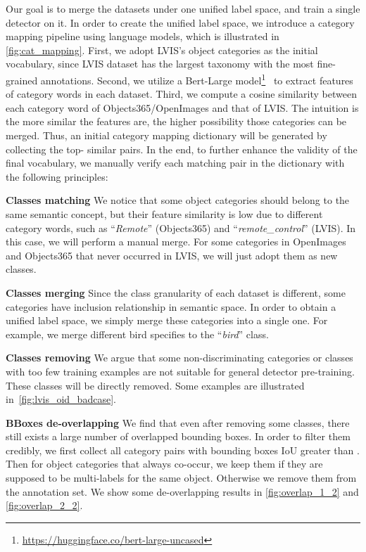 \documentclass[10pt,twocolumn,letterpaper]{article}
\begin{document}
Our goal is to merge the datasets under one unified label space, and train a single detector on it. In order to create the unified label space, we introduce a category mapping pipeline using language models, which is illustrated in \cref{fig:cat_mapping}.
First, we adopt LVIS's object categories as the initial vocabulary, since LVIS dataset has the largest taxonomy with the most fine-grained annotations.
Second, we utilize a Bert-Large model\footnote{\url{https://huggingface.co/bert-large-uncased}}~\cite{devlin2018bert} to extract features of category words in each dataset.
Third, we compute a cosine similarity between each category word of Objects365/OpenImages and that of LVIS. 
The intuition is the more similar the features are, the higher possibility those categories can be merged. 
Thus, an initial category mapping dictionary will be generated by collecting the top- similar pairs. 
In the end, to further enhance the validity of the final vocabulary, we manually verify each matching pair in the dictionary with the following principles:

\noindent \textbf{Classes matching} 
We notice that some object categories should belong to the same semantic concept, but their feature similarity is low due to different category words, such as ``\textit{Remote}'' (Objects365) and ``\textit{remote\_control}'' (LVIS). 
In this case, we will perform a manual merge.
For some categories in OpenImages and Objects365 that never occurred in LVIS, we will just adopt them as new classes.

\noindent \textbf{Classes merging}
Since the class granularity of each dataset is different, some categories have inclusion relationship in semantic space. In order to obtain a unified label space, we simply merge these categories into a single one. For example, we merge different bird specifies to the  ``\textit{bird}'' class.

\noindent \textbf{Classes removing} 
We argue that some non-discriminating categories or classes with too few training examples are not suitable for general detector pre-training. 
These classes will be directly removed. 
Some examples are illustrated in~\cref{fig:lvis_oid_badcase}.

\noindent \textbf{BBoxes de-overlapping} 
We find that even after removing some classes, there still exists a large number of overlapped bounding boxes. 
In order to filter them credibly, we first collect all category pairs with bounding boxes IoU greater than . 
Then for object categories that always co-occur, we keep them if they are supposed to be multi-labels for the same object. Otherwise we remove them from the annotation set.
We show some de-overlapping results in \cref{fig:overlap_1_2} and \cref{fig:overlap_2_2}. 
\end{document}
